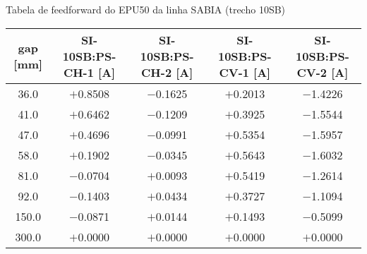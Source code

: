 \documentclass[oneside]{article}
\begin{document}
{}
\begin{landscape}
\centering
\Huge{Tabela de feedforward do EPU50 da linha SABIA (trecho 10SB)}

\vspace{1cm}
\begin{table}[!h]
\LARGE
\centering
\begin{tabular}{c|c|c|c|c}
\hline\hline
gap {[}mm{]} & SI-10SB:PS-CH-1 {[}A{]} & SI-10SB:PS-CH-2 {[}A{]} & SI-10SB:PS-CV-1 {[}A{]} & SI-10SB:PS-CV-2 {[}A{]} \\
\hline\hline
36.0                 & $+$0.8508   & $-$0.1625   & $+$0.2013   & $-$1.4226 \\ \hline
41.0                 & $+$0.6462   & $-$0.1209   & $+$0.3925   & $-$1.5544 \\ \hline
47.0                 & $+$0.4696   & $-$0.0991   & $+$0.5354   & $-$1.5957 \\ \hline
58.0                 & $+$0.1902   & $-$0.0345   & $+$0.5643   & $-$1.6032 \\ \hline
81.0                 & $-$0.0704   & $+$0.0093   & $+$0.5419   & $-$1.2614 \\ \hline
92.0                 & $-$0.1403   & $+$0.0434   & $+$0.3727   & $-$1.1094 \\ \hline
150.0                & $-$0.0871   & $+$0.0144   & $+$0.1493   & $-$0.5099 \\ \hline
300.0                & $+$0.0000   & $+$0.0000   & $+$0.0000   & $+$0.0000 \\

\hline
\hline
\end{tabular}
\label{tab:ffwd_table}
\end{table}
\end{landscape}
\end{document}
